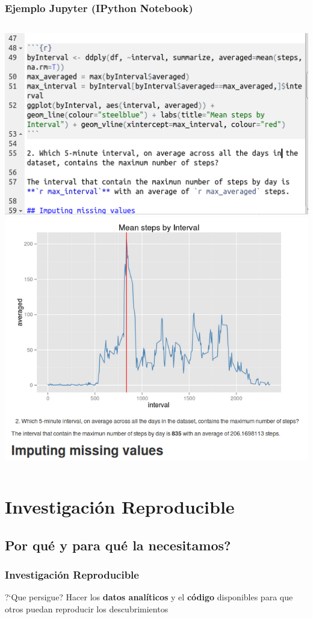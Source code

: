 \documentclass[sans serif,9pt,xcolor=dvipsnames]{beamer}%
\begin{document}
\begin{frame}
\frametitle{Ejemplo Jupyter (IPython Notebook)}
\begin{columns}
 \hspace{1cm}
\includegraphics[scale=0.3]{imagenes/rmd_input.png} 
\includegraphics[scale=0.24]{imagenes/rmd_output.png} 
\end{columns}
\end{frame}


\section{Investigación Reproducible}
\subsection{Por qué y para qué la necesitamos?}
\begin{frame}
\frametitle {Investigación Reproducible}
\justifying
\begin{block}{?`Que persigue?}
\LARGE Hacer los \textbf{datos analíticos} y el \textbf{código} disponibles para que otros puedan reproducir los descubrimientos
\end{block}
\end{frame}
\end{document}
